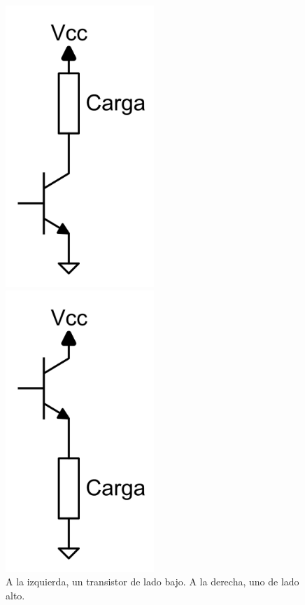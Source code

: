 \begin{figure}[H]
    \centering
    \centering
    \begin{minipage}{0.45\textwidth}
        \centering
        \includegraphics[width=0.5\textwidth]{images/low_high_side/Low_Side.png}
    \end{minipage}
    \begin{minipage}{0.45\textwidth}
        \centering
        \includegraphics[width=0.5\textwidth]{images/low_high_side/High_Side.png}
    \end{minipage}
    \caption{A la izquierda, un transistor de lado bajo. A la derecha, uno de lado alto.}
    \label{fig:high_side}
\end{figure}

